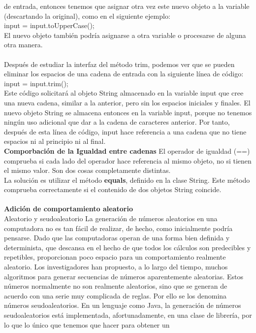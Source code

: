 \documentclass[11pt,a4paper]{article}
\begin{document}
	de entrada, entonces tenemos que asignar otra vez este nuevo objeto a la variable (descartando la
	original), como en el siguiente ejemplo:\\
	input = input.toUpperCase();\\
	El nuevo objeto también podría asignarse a otra variable o procesarse de alguna otra manera.\\
	\\
	Después de estudiar la interfaz del método trim, podemos ver que se pueden eliminar los espacios
	de una cadena de entrada con la siguiente línea de código:\\
	input = input.trim();
	\\
	Este código solicitará al objeto String almacenado en la variable input que cree una nueva
	cadena, similar a la anterior, pero sin los espacios iniciales y finales. El nuevo objeto String se
	almacena entonces en la variable input, porque no tenemos ningún uso adicional que dar a la
	cadena de caracteres anterior. Por tanto, después de esta línea de código, input hace referencia a
	una cadena que no tiene espacios ni al principio ni al final.\\
	\textbf{Comporbación de la Igualdad entre cadenas}
	El operador de igualdad (==) comprueba si cada lado del operador hace referencia
	al mismo objeto, no si tienen el mismo valor. Son dos cosas completamente distintas.\\
	La solución es utilizar el método \textbf{equals}, definido en la clase String. Este método comprueba
	correctamente si el contenido de dos objetos String coincide.\\
	\\
	\textbf{Adición de comportamiento aleatorio}\\
	 Aleatorio y seudoaleatorio La generación de números aleatorios en una computadora no es tan
	 fácil de realizar, de hecho, como inicialmente podría pensarse. Dado que las computadoras operan
	 de una forma bien definida y determinista, que descansa en el hecho de que todos los cálculos son
	 predecibles y repetibles, proporcionan poco espacio para un comportamiento realmente aleatorio.
	 Los investigadores han propuesto, a lo largo del tiempo, muchos algoritmos para generar secuencias
	 de números aparentemente aleatorias. Estos números normalmente no son realmente aleatorios, sino
	 que se generan de acuerdo con una serie muy complicada de reglas. Por ello se los denomina números
	 seudoaleatorios.
	 En un lenguaje como Java, la generación de números seudoaleatorios está implementada,
	 afortunadamente, en una clase de librería, por lo que lo único que tenemos que hacer para obtener un
\end{document}
